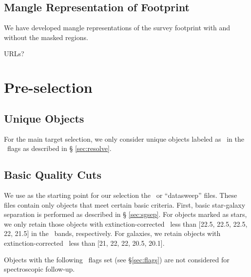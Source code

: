 \documentclass[12pt,preprint]{aastex}
\begin{document}
\subsection{Mangle Representation of Footprint}

We have developed mangle \citep{SwansonMangle08} representations of
the survey footprint with and without the masked regions.

URLs?

\section{Pre-selection}

\subsection{Unique Objects}

For the main target selection, we only consider unique objects labeled as
\surveyprimary\ in the \resolveflags\ flags as described in \S
\ref{sec:resolve}.

\subsection{Basic Quality Cuts} \label{sec:basiccuts}

We use as the starting point for our selection the \calibObj\ or ``datasweep''
files.   These files contain only objects that meet certain basic criteria.
First, basic star-galaxy separation is performed as described in \S
\ref{sec:sgsep}.  For objects marked as stars, we only retain those objects
with extinction-corrected \psfmag\ less than [22.5, 22.5, 22.5, 22, 21.5] in
the \allmag\ bands, respectively.  For galaxies, we retain objects with
extinction-corrected \modelmag\ less than [21, 22, 22, 20.5, 20.1].


Objects with the following \objflags\ flags set (see \S \ref{sec:flags}) are
not considered for spectroscopic follow-up.  
\end{document}
